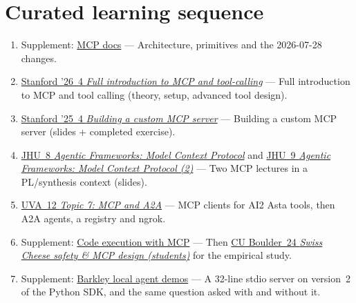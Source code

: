 \documentclass[10pt,oneside]{report}
\begin{document}
\section{Curated learning sequence}
\begin{enumerate}
\item Supplement: \hyperref[sup-mcp]{MCP docs} --- Architecture, primitives and the 2026-07-28 changes.
\item \hyperlink{lec-STAN26-4}{Stanford '26~4 \emph{Full introduction to MCP and tool-calling}} --- Full introduction to MCP and tool calling (theory, setup, advanced tool design).
\item \hyperlink{lec-STAN25-4}{Stanford '25~4 \emph{Building a custom MCP server}} --- Building a custom MCP server (slides + completed exercise).
\item \hyperlink{lec-JHU-8}{JHU~8 \emph{Agentic Frameworks: Model Context Protocol}} and \hyperlink{lec-JHU-9}{JHU~9 \emph{Agentic Frameworks: Model Context Protocol (2)}} --- Two MCP lectures in a PL/synthesis context (slides).
\item \hyperlink{lec-UVA-12}{UVA~12 \emph{Topic 7: MCP and A2A}} --- MCP clients for AI2 Asta tools, then A2A agents, a registry and ngrok.
\item Supplement: \hyperref[sup-codeexec]{Code execution with MCP} --- Then \hyperlink{lec-CU-24}{CU Boulder~24 \emph{Swiss Cheese safety \& MCP design (students)}} for the empirical study.
\item Supplement: \hyperref[sup-barkley]{Barkley local agent demos} --- A 32-line stdio server on version~2 of the Python SDK, and the same question asked with and without it.
\end{enumerate}
\end{document}
